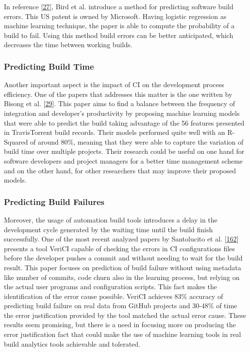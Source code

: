\documentclass[]{book}
\begin{document}
In reference {[}\protect\hyperlink{ref-bird2017predicting}{27}{]}, Bird
et al. introduce a method for predicting software build errors. This US
patent is owned by Microsoft. Having logistic regression as machine
learning technique, the paper is able to compute the probability of a
build to fail. Using this method build errors can be better anticipated,
which decreases the time between working builds.

\subsubsection{Predicting Build Time}\label{predicting-build-time}

Another important aspect is the impact of CI on the development process
efficiency. One of the papers that addresses this matter is the one
written by Bisong et al.
{[}\protect\hyperlink{ref-bisong2017built}{29}{]}. This paper aims to
find a balance between the frequency of integration and developer's
productivity by proposing machine learning models that were able to
predict the build taking advantage of the 56 features presented in
TravisTorrent build records. Their models performed quite well with an
R-Squared of around 80\%, meaning that they were able to capture the
variation of build time over multiple projects. Their research could be
useful on one hand for software developers and project managers for a
better time management scheme and on the other hand, for other
researchers that may improve their proposed models.

\subsubsection{Predicting Build
Failures}\label{predicting-build-failures}

Moreover, the usage of automation build tools introduces a delay in the
development cycle generated by the waiting time until the build finish
successfully. One of the most recent analyzed papers by Santolucito et
al. {[}\protect\hyperlink{ref-santolucito2018statically}{162}{]}
presents a tool VeriCI capable of checking the errors in CI
configurations files before the developer pushes a commit and without
needing to wait for the build result. This paper focuses on prediction
of build failure without using metadata like number of commits, code
churn also in the learning process, but relying on the actual user
programs and configuration scripts. This fact makes the identification
of the error cause possible. VeriCI achieves 83\% accuracy of predicting
build failure on real data from GitHub projects and 30-48\% of time the
error justification provided by the tool matched the actual error cause.
These results seem promising, but there is a need in focusing more on
producing the error justification fact that could make the use of
machine learning tools in real build analytics tools achievable and
tolerated.
\end{document}
